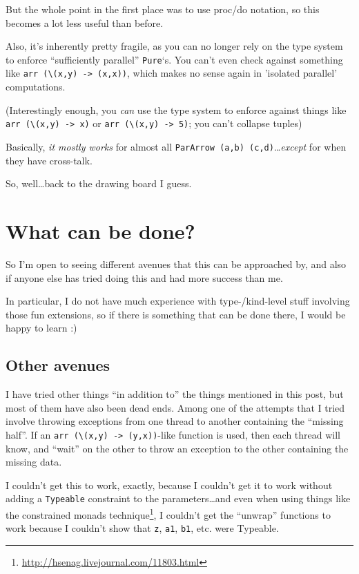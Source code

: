 \documentclass[]{article}
\renewcommand{\href}[2]{#2\footnote{\url{#1}}}
\begin{document}
But the whole point in the first place was to use proc/do notation, so
this becomes a lot less useful than before.

Also, it's inherently pretty fragile, as you can no longer rely on the
type system to enforce ``sufficiently parallel'' \texttt{Pure}`s. You
can't even check against something like
\texttt{arr\ (\textbackslash{}(x,y)\ -\textgreater{}\ (x,x))}, which
makes no sense again in 'isolated parallel' computations.

(Interestingly enough, you \emph{can} use the type system to enforce
against things like
\texttt{arr\ (\textbackslash{}(x,y)\ -\textgreater{}\ x)} or
\texttt{arr\ (\textbackslash{}(x,y)\ -\textgreater{}\ 5)}; you can't
collapse tuples)

Basically, \emph{it mostly works} for almost all
\texttt{ParArrow\ (a,b)\ (c,d)}\ldots{}\emph{except} for when they have
cross-talk.

So, well\ldots{}back to the drawing board I guess.

\section{What can be done?}\label{what-can-be-done}

So I'm open to seeing different avenues that this can be approached by,
and also if anyone else has tried doing this and had more success than
me.

In particular, I do not have much experience with type-/kind-level stuff
involving those fun extensions, so if there is something that can be
done there, I would be happy to learn :)

\subsection{Other avenues}\label{other-avenues}

I have tried other things ``in addition to'' the things mentioned in
this post, but most of them have also been dead ends. Among one of the
attempts that I tried involve throwing exceptions from one thread to
another containing the ``missing half''. If an
\texttt{arr\ (\textbackslash{}(x,y)\ -\textgreater{}\ (y,x))}-like
function is used, then each thread will know, and ``wait'' on the other
to throw an exception to the other containing the missing data.

I couldn't get this to work, exactly, because I couldn't get it to work
without adding a \texttt{Typeable} constraint to the
parameters\ldots{}and even when using things like the
\href{http://hsenag.livejournal.com/11803.html}{constrained monads
technique}, I couldn't get the ``unwrap'' functions to work because I
couldn't show that \texttt{z}, \texttt{a1}, \texttt{b1}, etc. were
Typeable.
\end{document}
